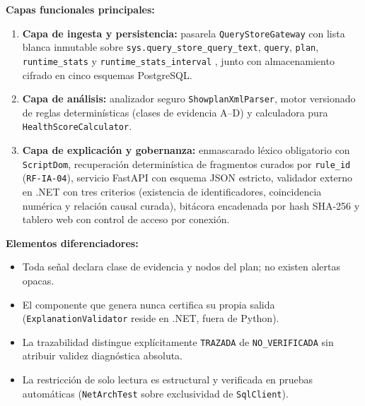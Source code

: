\documentclass[12pt,a4paper]{article}
\begin{document}
\textbf{Capas funcionales principales:}
\begin{enumerate}[leftmargin=1.5em]
    \item \textbf{Capa de ingesta y persistencia:} pasarela \texttt{QueryStoreGateway} con lista blanca inmutable sobre \texttt{sys.query\_store\_query\_text}, \texttt{query}, \texttt{plan}, \texttt{runtime\_stats} y \texttt{runtime\_stats\_interval} \cite{ms-qs-plan,ms-qs-stats}, junto con almacenamiento cifrado en cinco esquemas PostgreSQL.
    \item \textbf{Capa de análisis:} analizador seguro \texttt{ShowplanXmlParser}, motor versionado de reglas determinísticas (clases de evidencia A--D) y calculadora pura \texttt{HealthScoreCalculator}.
    \item \textbf{Capa de explicación y gobernanza:} enmascarado léxico obligatorio con \texttt{ScriptDom}, recuperación determinística de fragmentos curados por \texttt{rule\_id} (\texttt{RF-IA-04}), servicio FastAPI con esquema JSON estricto, validador externo en .NET con tres criterios (existencia de identificadores, coincidencia numérica y relación causal curada), bitácora encadenada por hash SHA-256 y tablero web con control de acceso por conexión.
\end{enumerate}

\textbf{Elementos diferenciadores:}
\begin{itemize}[leftmargin=1.5em]
    \item Toda señal declara clase de evidencia y nodos del plan; no existen alertas opacas.
    \item El componente que genera nunca certifica su propia salida (\texttt{ExplanationValidator} reside en .NET, fuera de Python).
    \item La trazabilidad distingue explícitamente \texttt{TRAZADA} de \texttt{NO\_VERIFICADA} sin atribuir validez diagnóstica absoluta.
    \item La restricción de solo lectura es estructural y verificada en pruebas automáticas (\texttt{NetArchTest} sobre exclusividad de \texttt{SqlClient}).
\end{itemize}
\end{document}
